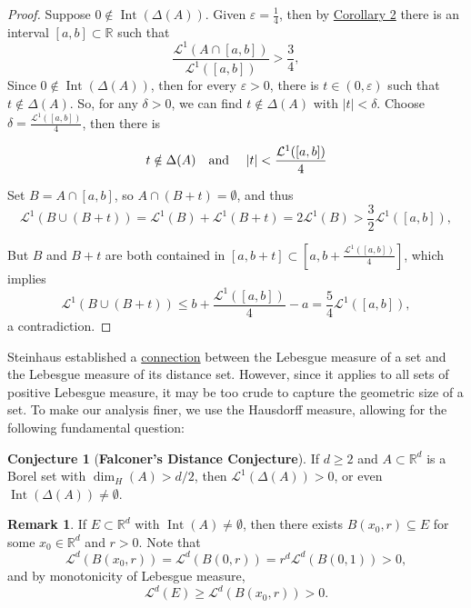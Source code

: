 \documentclass[12pt,a4paper]{report}
\theoremstyle{definition}
\newtheorem{conjecture}{Conjecture}
\newtheorem{remark}{Remark}
\begin{document}
\begin{proof}
Suppose $0 \notin \operatorname{Int}(\Delta(A))$. Given \( \varepsilon = \frac{1}{4} \), then by \hyperref[cor2]{Corollary 2} there is an interval \( [a,b] \subset \mathbb{R} \) such that
\[
\frac{\mathcal{L}^1(A \cap [a,b])}{\mathcal{L}^1([a,b])} > \frac{3}{4},
\]
Since $0 \notin \operatorname{Int}(\Delta(A))$, then for every $\varepsilon>0$, there is $t \in (0, \varepsilon)$ such that $t \notin \Delta(A)$. So, for any $\delta > 0$, we can find $t \notin \Delta(A)$ with $|t| < \delta$. Choose $\delta = \frac{\mathcal{L}^1([a,b])}{4}$, then there is

$$t \notin \Delta(A) \text{\quad and \quad}|t| < \frac{\mathcal{L}^1([a,b])}{4}$$

Set \( B = A \cap [a,b] \), so $A \cap (B+t) = \emptyset$, and thus
$$\mathcal{L}^1(B \cup (B + t)) = \mathcal{L}^1(B) + \mathcal{L}^1(B + t) = 2 \mathcal{L}^1(B)> \frac{3}{2} \mathcal{L}^1([a,b]), $$

But $B$ and $B+t$ are both contained in $[a,b+t] \subset [a,b+ \frac{\mathcal{L}^1([a,b])}{4}]$, which implies
$$ \mathcal{L}^1(B \cup (B + t)) \leq  b +\frac{\mathcal{L}^1([a,b])}{4} - a = \frac{5}{4} \mathcal{L}^1([a,b]),$$ a contradiction.
\end{proof}

Steinhaus established a \hyperref[steinhaus]{connection} between the Lebesgue measure of a set and the Lebesgue measure of its distance set. However, since it applies to all sets of positive Lebesgue measure, it may be too crude to capture the geometric size of a set. To make our analysis finer, we use the Hausdorff measure, allowing for the following fundamental question:

\begin{conjecture}[\textbf{Falconer's Distance Conjecture}] \label{falconer}
If \( d \geq 2 \) and \( A \subset \mathbb{R}^d \) is a Borel set with \( \dim_H(A) > d/2 \), then
\( \mathcal{L}^1(\Delta(A)) > 0 \), or even \( \operatorname{Int}(\Delta(A)) \neq \emptyset \).
\end{conjecture}

\begin{remark}
If $E \subset \mathbb{R}^d$ with \( \operatorname{Int}(A) \ne \emptyset \), then there exists $ B(x_0, r) \subseteq E$  for some \( x_0 \in \mathbb{R}^d \) and \( r > 0 \).
Note that
\[
\mathcal{L}^d(B(x_0, r)) = \mathcal{L}^d(B(0, r)) = r^d \mathcal{L}^d(B(0, 1))> 0,
\]
and by monotonicity of Lebesgue measure,
\[
\mathcal{L}^d(E) \ge \mathcal{L}^d(B(x_0, r)) > 0.
\]
\end{remark}
\end{document}

